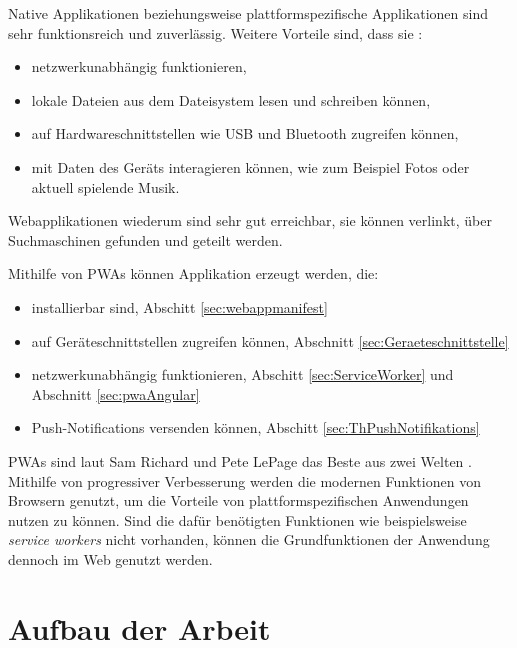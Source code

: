 Native Applikationen beziehungsweise plattformspezifische Applikationen sind sehr funktionsreich und zuverlässig. Weitere Vorteile sind, dass sie : 
\begin{itemize}
    \item  netzwerkunabhängig funktionieren,
    \item  lokale Dateien aus dem Dateisystem lesen und schreiben können, 
    \item  auf Hardwareschnittstellen wie USB und Bluetooth zugreifen können, 
    \item  mit Daten des Geräts interagieren können, wie zum Beispiel Fotos oder aktuell spielende Musik. 
\end{itemize}

Webapplikationen wiederum sind sehr gut erreichbar, sie können verlinkt, über Suchmaschinen gefunden und geteilt werden. 

Mithilfe von PWAs können Applikation erzeugt werden, die: 
\begin{itemize}
    \item installierbar sind, Abschitt \ref{sec:webappmanifest} 
    \item auf Geräteschnittstellen zugreifen können, Abschnitt \ref{sec:Geraeteschnittstelle} 
    \item netzwerkunabhängig funktionieren, Abschitt \ref{sec:ServiceWorker} und Abschnitt \ref{sec:pwaAngular}
    \item Push-Notifications versenden können, Abschitt \ref{sec:ThPushNotifikations}
\end{itemize}

PWAs sind laut Sam Richard und Pete LePage das Beste aus zwei Welten \cite{SamRichard2020}. Mithilfe von progressiver Verbesserung werden die modernen Funktionen von Browsern genutzt, um die Vorteile von plattformspezifischen Anwendungen nutzen zu können. Sind die dafür benötigten Funktionen wie beispielsweise \textit{service workers} nicht vorhanden, können die Grundfunktionen der Anwendung dennoch im Web genutzt werden. 

\section{Aufbau der Arbeit}\label{se:AufbauDerArbeit}
